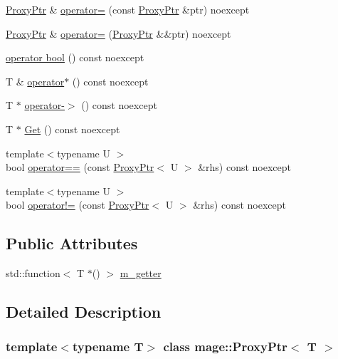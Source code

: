 \begin{DoxyCompactItemize}
\item 
\hyperlink{classmage_1_1_proxy_ptr}{Proxy\+Ptr} \& \hyperlink{classmage_1_1_proxy_ptr_a2d3a3a7595028a72a97a2c2131947a8d}{operator=} (const \hyperlink{classmage_1_1_proxy_ptr}{Proxy\+Ptr} \&ptr) noexcept
\item 
\hyperlink{classmage_1_1_proxy_ptr}{Proxy\+Ptr} \& \hyperlink{classmage_1_1_proxy_ptr_a53e38a57d8155b8cd59b3d6e332995b7}{operator=} (\hyperlink{classmage_1_1_proxy_ptr}{Proxy\+Ptr} \&\&ptr) noexcept
\item 
\hyperlink{classmage_1_1_proxy_ptr_ac1226dcf54a735bb5da12273c38e9b8f}{operator bool} () const noexcept
\item 
T \& \hyperlink{classmage_1_1_proxy_ptr_aaf7b96ea7e8350ce5f2ae1f504627fd9}{operator$\ast$} () const noexcept
\item 
T $\ast$ \hyperlink{classmage_1_1_proxy_ptr_af33f20a43615df2328d7436ff3145d54}{operator-\/$>$} () const noexcept
\item 
T $\ast$ \hyperlink{classmage_1_1_proxy_ptr_a9af6f8e3b1f1aa9d5b323ed01fb9b40d}{Get} () const noexcept
\item 
{\footnotesize template$<$typename U $>$ }\\bool \hyperlink{classmage_1_1_proxy_ptr_a786d92c5d87ac0349a60cf99642bd890}{operator==} (const \hyperlink{classmage_1_1_proxy_ptr}{Proxy\+Ptr}$<$ U $>$ \&rhs) const noexcept
\item 
{\footnotesize template$<$typename U $>$ }\\bool \hyperlink{classmage_1_1_proxy_ptr_a14c1832a1f6b48c69337931d49bf3676}{operator!=} (const \hyperlink{classmage_1_1_proxy_ptr}{Proxy\+Ptr}$<$ U $>$ \&rhs) const noexcept
\end{DoxyCompactItemize}
\subsection*{Public Attributes}
\begin{DoxyCompactItemize}
\item 
std\+::function$<$ T $\ast$() $>$ \hyperlink{classmage_1_1_proxy_ptr_a78fad290d478eb55285d4ab01cda1669}{m\+\_\+getter}
\end{DoxyCompactItemize}


\subsection{Detailed Description}
\subsubsection*{template$<$typename T$>$\newline
class mage\+::\+Proxy\+Ptr$<$ T $>$}

